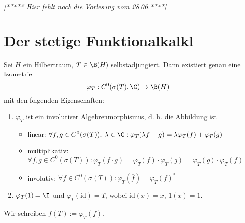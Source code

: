 \textit{[***** Hier fehlt noch die Vorlesung vom 28.06.****]}

\section{Der stetige Funktionalkalk\us l}
\begin{theorem}
	Sei $H$ ein Hilbertraum, \(T\in \B(H)\) selbstadjungiert. Dann existiert genau eine Isometrie 
	\[\varphi_T: C^0(\sigma(T),\C) \to \B(H)\]
	mit den folgenden Eigenschaften:
	\begin{enumerate}
		\item $\varphi_T$ ist ein involutiver Algebrenmorphismus, d. h. die Abbildung ist
		\begin{itemize}
		\item linear:\;\; \(\forall f, g \in C^0(\sigma(T)), \;\lambda \in \C: \varphi_T( \lambda f+g)  = \lambda \varphi_T(f) + \varphi_T(g)\)
		\item multiplikativ: \;\;\(\forall f, g \in C^0(\sigma(T)): \varphi_T(f\cdot g) = \varphi_T(f)\cdot\varphi_T(g) = \varphi_T(g) \cdot \varphi_T(f)\)
		\item involutiv: \;\; \(\forall f \in C^0(\sigma(T)): \varphi_T(\overline{f}) = \varphi_T(f)^*\)
		\end{itemize}
		\item \(\varphi_T(1) = \I\) und \(\varphi_T(\text{id}) = T\), wobei \(\text{id}(x) = x\), \(1(x) = 1\).
	\end{enumerate}
\end{theorem}

\begin{rem}
	Wir schreiben \(f(T) := \varphi_T(f)\).
\end{rem}

